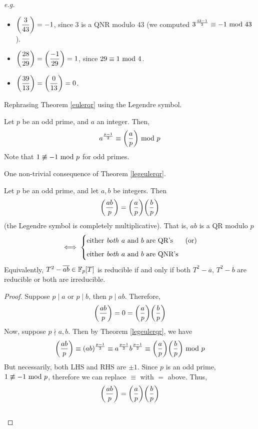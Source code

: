 
\emph{e.g.} 
\begin{itemize}
\item $\bigg(\dfrac{3}{43}\bigg) = -1$, since $3$ is a QNR modulo $43$ (we computed $3^{\frac{43-1}{2}} \equiv -1\text{ mod }{43}$).
\item $\bigg(\dfrac{28}{29}\bigg) = \bigg(\dfrac{-1}{29}\bigg) = 1$, since $29 \equiv 1 \text{ mod }{4}$.
\item $\bigg(\dfrac{39}{13}\bigg) = \bigg(\dfrac{0}{13}\bigg) = 0$.
\end{itemize}

\vspace*{1em}

Rephrasing Theorem \ref{eulerqr} using the Legendre symbol.
\begin{theorem}[Euler]\label{legeulerqr}
Let $p$ be an odd prime, and $a$ an integer. Then,
\[a^{\frac{p-1}{2}} \equiv \bigg(\dfrac{a}{p}\bigg)\text{ mod }{p}\]
Note that $1 \not\equiv -1\text{ mod }{p}$ for odd primes.
\end{theorem}

\vspace*{1.5em}

One non-trivial consequence of Theorem \ref{legeulerqr}.
\begin{corollary}
Let $p$ be an odd prime, and let $a,b$ be integers. Then
\[\bigg(\dfrac{ab}{p}\bigg) = \bigg(\dfrac{a}{p}\bigg)\bigg(\dfrac{b}{p}\bigg)\]
(the Legendre symbol is completely multiplicative). That is, $ab$ is a QR modulo $p$
\[\iff \begin{cases}\text{either \emph{both} $a$ and $b$ are QR's} & \text{(or)}\\[0.5em] \text{either \emph{both} $a$ and $b$ are QNR's} \end{cases}\]
Equivalently, $T^2 - \overline{ab} \in \mathbb F_p[T]$ is reducible if and only if both $T^2 - \overline{a},\, T^2 - \overline{b}$ are reducible or both are irreducible.
\end{corollary}
\begin{proof}
Suppose $p\mid a$ or $p\mid b$, then $p\mid ab$. Therefore,
\[\bigg(\dfrac{ab}{p}\bigg) = 0 = \bigg(\dfrac{a}{p}\bigg)\bigg(\dfrac{b}{p}\bigg)\]
Now, suppose $p\nmid a,b$. Then by Theorem \ref{legeulerqr}, we have
\[\bigg(\dfrac{ab}{p}\bigg) \equiv (ab)^{\frac{p-1}{2}} \equiv a^{\frac{p-1}{2}}b^{\frac{p-1}{2}} \equiv \bigg(\dfrac{a}{p}\bigg)\bigg(\dfrac{b}{p}\bigg)\text{ mod }{p}\]
But necessarily, both LHS and RHS are $\pm 1$. Since $p$ is an odd prime, $1 \not\equiv -1\text{ mod }{p}$, therefore we can replace $\equiv$ with $=$ above. Thus,
\[\bigg(\dfrac{ab}{p}\bigg) = \bigg(\dfrac{a}{p}\bigg)\bigg(\dfrac{b}{p}\bigg)\]\\[-2em]
\end{proof}

